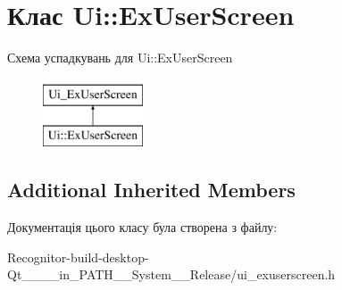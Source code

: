 \hypertarget{classUi_1_1ExUserScreen}{\section{Клас Ui\-:\-:Ex\-User\-Screen}
\label{classUi_1_1ExUserScreen}
}
Схема успадкувань для Ui\-:\-:Ex\-User\-Screen\begin{figure}[H]
\begin{center}
\leavevmode
\includegraphics[height=2.000000cm]{classUi_1_1ExUserScreen}
\end{center}
\end{figure}
\subsection*{Additional Inherited Members}


Документація цього класу була створена з файлу\-:\begin{DoxyCompactItemize}
\item 
Recognitor-\/build-\/desktop-\/\-Qt\-\_\-\_\-\_\-\_\-in\-\_\-\-P\-A\-T\-H\-\_\-\-\_\-\-System\-\_\-\-\_\-\-Release/ui\-\_\-exuserscreen.\-h\end{DoxyCompactItemize}
